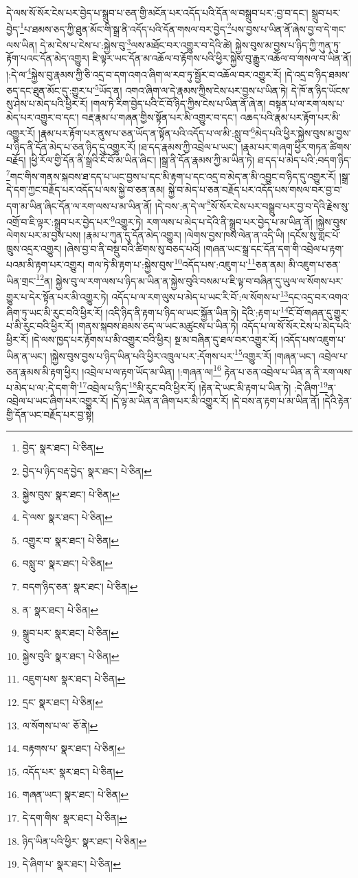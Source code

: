 དེ་ལས་སོ་སོར་ངེས་པར་བྱེད་པ་སྒྲུབ་པ་ཅན་གྱི་མངོན་པར་འདོད་པའི་དོན་ལ་བསྒྲུབ་པར་:བྱ་བ་དང་། སྒྲུབ་པར་བྱེད་\footnote{བྱེད་  སྣར་ཐང་།  པེ་ཅིན། }པ་ཐམས་ཅད་ཀྱི་ཐུན་མོང་གི་སྒྲ་ནི་འདོད་པའི་དོན་གསལ་བར་བྱེད་\footnote{བྱེད་པ་ཉིད་བརྡ་བྱེད་  སྣར་ཐང་།  པེ་ཅིན། }པས་བྱས་པ་ཡིན་ནོ་ཞེས་བྱ་བ་དེ་གང་ལས་ཡིན། དེ་མ་ངེས་པ་ངེས་པ་:སྐྱེས་བུ་\footnote{སྐྱེས་བུས་  སྣར་ཐང་།  པེ་ཅིན། }ལས་མཐོང་བར་འགྱུར་བ་དེའི་ཚེ། སྐྱེས་བུས་མ་བྱས་པ་ཉིད་ཀྱི་ཀུན་ཏུ་རྟོག་པའང་དོན་མེད་འགྱུར། ཇི་ལྟར་ཡང་དོན་མ་འཆོལ་བ་རྟོགས་པའི་ཕྱིར་སྐྱེས་བུ་རྒྱུར་འཆོལ་བ་གསལ་བ་ཡིན་ནོ། །:དེ་ལ་\footnote{དེ་ལས་  སྣར་ཐང་།  པེ་ཅིན། }སྐྱེས་བུ་རྣམས་ཀྱི་ཅི་འདྲ་བ་དག་འགའ་ཞིག་ལ་རབ་ཏུ་སྦྱོར་བ་འཆོལ་བར་འགྱུར་རོ། །དེ་འདྲ་བ་ཉིད་ཐམས་ཅད་དང་ཐུན་མོང་དུ་:གྱུར་པ་\footnote{འགྱུར་བ་  སྣར་ཐང་།  པེ་ཅིན། }ཡོད་ན། འགའ་ཞིག་ལ་དེ་རྣམས་ཀྱིས་ངེས་པར་བྱས་པ་ཡིན་ཏེ། དེ་ཁོ་ན་ཉིད་ཡོངས་སུ་ཤེས་པ་མེད་པའི་ཕྱིར་རོ། །གལ་ཏེ་རིག་བྱེད་པའི་ངོ་བོ་ཉིད་ཀྱིས་ངེས་པ་ཡིན་ནོ་ཞེ་ན། བསྟན་པ་ལ་རག་ལས་པ་མེད་པར་འགྱུར་བ་དང་། བརྡ་རྣམ་པ་གཞན་གྱིས་སྟོན་པར་མི་འགྱུར་བ་དང་། འཆད་པའི་རྣམ་པར་རྟོག་པར་མི་འགྱུར་རོ། །རྣམ་པར་རྟོག་པར་ནུས་པ་ཅན་ཡོད་ན་སྟོན་པའི་འདོད་པ་ལ་མི་:སླུ་བ་\footnote{བསླུ་བ་  སྣར་ཐང་།  པེ་ཅིན། }མེད་པའི་ཕྱིར་སྐྱེས་བུས་མ་བྱས་པ་ཉིད་ནི་དོན་མེད་པ་ཅན་ཉིད་དུ་འགྱུར་རོ། །ཐ་དད་རྣམས་ཀྱི་འབྲེལ་པ་ཡང་། །རྣམ་པར་གཞག་ཕྱིར་གཏན་ཚིགས་བརྗོད། །ཕྱི་རོལ་གྱི་དོན་ནི་སྒྲའི་ངོ་བོ་མ་ཡིན་ཞིང་། །སྒྲ་ནི་དོན་རྣམས་ཀྱི་མ་ཡིན་ཏེ། ཐ་དད་པ་མེད་པའི་:བདག་ཉིད་\footnote{བདག་ཉིད་ཅན་  སྣར་ཐང་།  པེ་ཅིན། }གང་གིས་གནས་སྐབས་ཐ་དད་པ་ཡང་བྱས་པ་དང་མི་རྟག་པ་དང་འདྲ་བ་མེད་ན་མི་འབྱུང་བ་ཉིད་དུ་འགྱུར་རོ། །སྒྲ་དེ་དག་ཀྱང་བརྗོད་པར་འདོད་པ་ལས་སྐྱེ་བ་ཅན་ནམ། སྐྱེ་བ་མེད་པ་ཅན་བརྗོད་པར་འདོད་པས་གསལ་བར་བྱ་བ་དག་མ་ཡིན་ཞིང་དོན་ལ་རག་ལས་པ་མ་ཡིན་ནོ། །དེ་བས་:ན་དེ་ལ་\footnote{ན་  སྣར་ཐང་།  པེ་ཅིན། }སོ་སོར་ངེས་པར་བསྒྲུབ་པར་བྱ་བ་དེའི་རྗེས་སུ་འགྲོ་བ་ཇི་ལྟར་:སྒྲུབ་པར་བྱེད་པར་\footnote{སྒྲུབ་པར་  སྣར་ཐང་།  པེ་ཅིན། }འགྱུར་ཏེ། རག་ལས་པ་མེད་པ་དེའི་ནི་སྒྲུབ་པར་བྱེད་པ་མ་ཡིན་ནོ། །སྐྱེས་བུས་ལེགས་པར་མ་བྱས་པས། །རྣམ་པ་ཀུན་དུ་དོན་མེད་འགྱུར། །ལེགས་བྱས་ཁས་ལེན་ན་འདི་ཡི། །དངོས་སུ་གླང་པོ་ཁྲུས་འདྲར་འགྱུར། །ཞེས་བྱ་བ་ནི་བསྡུ་བའི་ཚིགས་སུ་བཅད་པའོ། །གཞན་ཡང་སྒྲ་དང་དོན་དག་གི་འབྲེལ་པ་རྟག་པའམ་མི་རྟག་པར་འགྱུར། གལ་ཏེ་མི་རྟག་པ་:སྐྱེས་བུས་\footnote{སྐྱེས་བུའི་  སྣར་ཐང་།  པེ་ཅིན། }འདོད་པས་:འཇུག་པ་\footnote{འཇུག་པས་  སྣར་ཐང་།  པེ་ཅིན། }ཅན་ནམ། མི་འཇུག་པ་ཅན་ཡིན་གྲང་\footnote{དྲང་  སྣར་ཐང་།  པེ་ཅིན། }ན། སྐྱེས་བུ་ལ་རག་ལས་པ་ཉིད་མ་ཡིན་ན་སྐྱེས་བུའི་བསམ་པ་ཇི་ལྟ་བ་བཞིན་དུ་ཡུལ་ལ་སོགས་པར་གྱུར་པ་དེར་སྟོན་པར་མི་འགྱུར་ཏེ། འདོད་པ་ལ་རག་ལུས་པ་མེད་པ་ཡང་རི་བོ་:ལ་སོགས་པ་\footnote{ལ་སོགས་པ་ལ་  ཅོ་ནེ། }དང་འདྲ་བར་འགའ་ཞིག་ཏུ་ཡང་མི་རུང་བའི་ཕྱིར་རོ། །འདི་ཉིད་ནི་རྟག་པ་ཉིད་ལ་ཡང་སྐྱོན་ཡིན་ཏེ། དེའི་:རྟག་པ་\footnote{བརྟགས་པ་  སྣར་ཐང་།  པེ་ཅིན། }ངོ་བོ་གཞན་དུ་གྱུར་པ་མི་རུང་བའི་ཕྱིར་རོ། །གནས་སྐབས་ཐམས་ཅད་ལ་ཡང་མཚུངས་པ་ཡིན་ཏེ། འདོད་པ་ལ་སོ་སོར་ངེས་པ་མེད་པའི་ཕྱིར་རོ། །དེ་ལས་ཁྱད་པར་རྟོགས་པ་མི་འགྱུར་བའི་ཕྱིར། སྔ་མ་བཞིན་དུ་ཐལ་བར་འགྱུར་རོ། །འདོད་པས་འཇུག་པ་ཡིན་ན་ཡང་། །སྐྱེས་བུས་བྱས་པ་ཉིད་ཡིན་པའི་ཕྱིར་འཁྲུལ་པར་:དོགས་པར་\footnote{འདོད་པར་  སྣར་ཐང་།  པེ་ཅིན། }འགྱུར་རོ། །གཞན་ཡང་། འབྲེལ་པ་ཅན་རྣམས་མི་རྟག་ཕྱིར། །འབྲེལ་པ་ལ་རྟག་ཡོད་མ་ཡིན། །:གཞན་ལ།\footnote{གཞན་ཡང་།  སྣར་ཐང་།  པེ་ཅིན། } རྟེན་པ་ཅན་འབྲེལ་པ་ཡིན་ན་ནི་རག་ལས་པ་མེད་པ་ལ་:དེ་དག་གི་\footnote{དེ་དག་གིས་  སྣར་ཐང་།  པེ་ཅིན། }འབྲེལ་པ་ཉིད་\footnote{ཉིད་ཡིན་པའི་ཕྱིར་  སྣར་ཐང་།  པེ་ཅིན། }མི་རུང་བའི་ཕྱིར་རོ། །རྟེན་དེ་ཡང་མི་རྟག་པ་ཡིན་ཏེ། :དེ་ཞིག་\footnote{དེ་ཞིག་པ་  སྣར་ཐང་།  པེ་ཅིན། }ན་འབྲེལ་པ་ཡང་ཞིག་པར་འགྱུར་རོ། །དེ་ལྟ་མ་ཡིན་ན་ཞིག་པར་མི་འགྱུར་རོ། །དེ་བས་ན་རྟག་པ་མ་ཡིན་ནོ། །དེའི་རྟེན་གྱི་དོན་ཡང་བརྗོད་པར་བྱ་སྟེ། 
